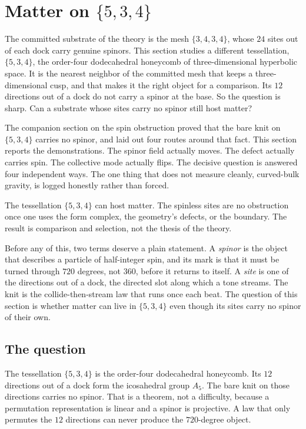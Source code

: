 \section{Matter on \texorpdfstring{$\{5,3,4\}$}{534}}

The committed substrate of the theory is the mesh $\{3,4,3,4\}$, whose $24$ sites out of each dock carry genuine spinors. This section studies a different tessellation, $\{5,3,4\}$, the order-four dodecahedral honeycomb of three-dimensional hyperbolic space. It is the nearest neighbor of the committed mesh that keeps a three-dimensional cusp, and that makes it the right object for a comparison. Its $12$ directions out of a dock do not carry a spinor at the base. So the question is sharp. Can a substrate whose sites carry no spinor still host matter?

The companion section on the spin obstruction proved that the bare knit on $\{5,3,4\}$ carries no spinor, and laid out four routes around that fact. This section reports the demonstrations. The spinor field actually moves. The defect actually carries spin. The collective mode actually flips. The decisive question is answered four independent ways. The one thing that does not measure cleanly, curved-bulk gravity, is logged honestly rather than forced.

\begin{principle}
The tessellation $\{5,3,4\}$ can host matter. The spinless sites are no obstruction once one uses the form complex, the geometry's defects, or the boundary. The result is comparison and selection, not the thesis of the theory.
\end{principle}

Before any of this, two terms deserve a plain statement. A \emph{spinor} is the object that describes a particle of half-integer spin, and its mark is that it must be turned through $720$ degrees, not $360$, before it returns to itself. A \emph{site} is one of the directions out of a dock, the directed slot along which a tone streams. The knit is the collide-then-stream law that runs once each beat. The question of this section is whether matter can live in $\{5,3,4\}$ even though its sites carry no spinor of their own.

\subsection{The question}

The tessellation $\{5,3,4\}$ is the order-four dodecahedral honeycomb. Its $12$ directions out of a dock form the icosahedral group $A_5$. The bare knit on those directions carries no spinor. That is a theorem, not a difficulty, because a permutation representation is linear and a spinor is projective. A law that only permutes the $12$ directions can never produce the $720$-degree object.

